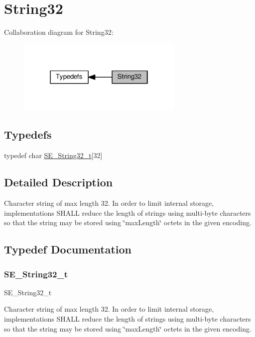 \hypertarget{group__String32}{}\section{String32}
\label{group__String32}
Collaboration diagram for String32\+:\nopagebreak
\begin{figure}[H]
\begin{center}
\leavevmode
\includegraphics[width=226pt]{group__String32}
\end{center}
\end{figure}
\subsection*{Typedefs}
\begin{DoxyCompactItemize}
\item 
typedef char \hyperlink{group__String32_gac9f59b06b168b4d2e0d45ed41699af42}{S\+E\+\_\+\+String32\+\_\+t}\mbox{[}32\mbox{]}
\end{DoxyCompactItemize}


\subsection{Detailed Description}
Character string of max length 32. In order to limit internal storage, implementations S\+H\+A\+LL reduce the length of strings using multi-\/byte characters so that the string may be stored using \char`\"{}max\+Length\char`\"{} octets in the given encoding. 

\subsection{Typedef Documentation}
\mbox{\label{group__String32_gac9f59b06b168b4d2e0d45ed41699af42}} 
\subsubsection{\texorpdfstring{S\+E\+\_\+\+String32\+\_\+t}{SE\_String32\_t}}
{\footnotesize\ttfamily S\+E\+\_\+\+String32\+\_\+t}

Character string of max length 32. In order to limit internal storage, implementations S\+H\+A\+LL reduce the length of strings using multi-\/byte characters so that the string may be stored using \char`\"{}max\+Length\char`\"{} octets in the given encoding. 